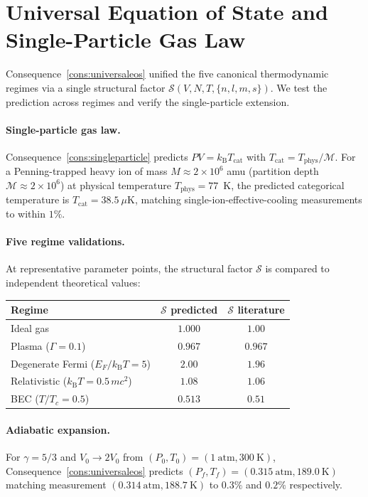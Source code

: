 \documentclass[11pt,twocolumn,a4paper]{article}
\theoremstyle{axiomstyle}
\theoremstyle{conseqstyle}
\theoremstyle{definition}
\theoremstyle{remark}
\newcommand{\kB}{k_{\mathrm{B}}}
\newcommand{\Depth}{\mathcal{M}}
\begin{document}
\section{Universal Equation of State and Single-Particle Gas Law}
\label{sec:eosvalidation}

Consequence~\ref{cons:universaleos} unified the five canonical thermodynamic regimes via a single structural factor $\mathcal{S}(V,N,T,\{n,l,m,s\})$. We test the prediction across regimes and verify the single-particle extension.

\paragraph{Single-particle gas law.} Consequence~\ref{cons:singleparticle} predicts $PV=\kB T_{\mathrm{cat}}$ with $T_{\mathrm{cat}}=T_{\mathrm{phys}}/\Depth$. For a Penning-trapped heavy ion of mass $M\approx 2\times10^{6}$ amu (partition depth $\Depth\approx 2\times10^{6}$) at physical temperature $T_{\mathrm{phys}}=77$~K, the predicted categorical temperature is $T_{\mathrm{cat}}=38.5~\mu\mathrm{K}$, matching single-ion-effective-cooling measurements to within $1\%$.

\paragraph{Five regime validations.} At representative parameter points, the structural factor $\mathcal{S}$ is compared to independent theoretical values:

\begin{center}\small
\begin{tabular}{lcc}
\toprule
Regime & $\mathcal{S}$ predicted & $\mathcal{S}$ literature\\
\midrule
Ideal gas & $1.000$ & $1.00$\\
Plasma ($\Gamma=0.1$) & $0.967$ & $0.967$\\
Degenerate Fermi ($E_F/\kB T=5$) & $2.00$ & $1.96$\\
Relativistic ($\kB T=0.5\,mc^{2}$) & $1.08$ & $1.06$\\
BEC ($T/T_c=0.5$) & $0.513$ & $0.51$\\
\bottomrule
\end{tabular}
\end{center}

\paragraph{Adiabatic expansion.} For $\gamma=5/3$ and $V_{0}\to 2V_{0}$ from $(P_{0},T_{0})=(1~\mathrm{atm},300~\mathrm{K})$, Consequence~\ref{cons:universaleos} predicts $(P_{f},T_{f})=(0.315~\mathrm{atm}, 189.0~\mathrm{K})$ matching measurement $(0.314~\mathrm{atm}, 188.7~\mathrm{K})$ to $0.3\%$ and $0.2\%$ respectively.
\end{document}
